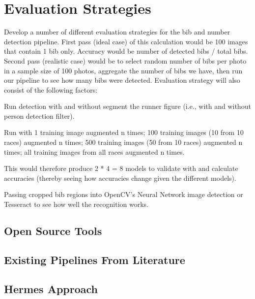 \chapter{Evaluation Strategies}
\label{ch:evaluation}




Develop a number of different evaluation strategies for the bib and number detection pipeline. First pass (ideal case) of this calculation would be 100 images that contain 1 bib only. Accuracy would be number of detected bibs / total bibs. Second pass (realistic case) would be to select random number of bibs per photo in a sample size of 100 photos, aggregate the number of bibs we have, then run our pipeline to see how many bibs were detected. Evaluation strategy will also consist of the following factors:

Run detection with and without segment the runner figure (i.e., with and without person detection filter).

Run with 1 training image augmented n times; 100 training images (10 from 10 races) augmented n times; 500 training images (50 from 10 races) augmented n times; all training images from all races augmented n times. 

This would therefore produce 2 * 4 = 8 models to validate with and calculate accuracies (thereby seeing how accuracies change given the different models).

Passing cropped bib regions into OpenCV's Neural Network image detection or Tesseract to see how well the recognition works.


\section{Open Source Tools}

\section{Existing Pipelines From Literature}

\section{Hermes Approach}

